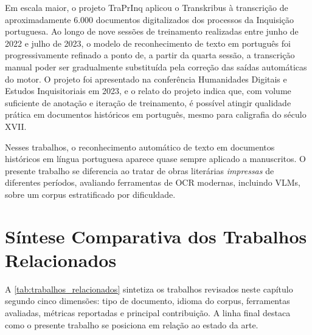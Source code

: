 \documentclass[noabntexcite,oneside]{ufsc-thesis-rn46-2019}
\begin{document}
Em escala maior, o projeto TraPrInq \cite{baudry2023} aplicou o Transkribus à transcrição
de aproximadamente 6.000 documentos digitalizados dos processos da Inquisição portuguesa.
Ao longo de nove sessões de treinamento realizadas entre junho de 2022 e julho de 2023,
o modelo de reconhecimento de texto em português foi progressivamente refinado a ponto
de, a partir da quarta sessão, a transcrição manual poder ser gradualmente substituída
pela correção das saídas automáticas do motor. O projeto foi apresentado na conferência
Humanidades Digitais e Estudos Inquisitoriais em 2023, e o relato do projeto indica que,
com volume suficiente de anotação e iteração de treinamento, é possível atingir qualidade
prática em documentos históricos em português, mesmo para caligrafia do século XVII.

Nesses trabalhos, o reconhecimento automático de texto em documentos históricos em
língua portuguesa aparece quase sempre aplicado a manuscritos. O presente trabalho se
diferencia ao tratar de obras literárias \textit{impressas} de diferentes períodos,
avaliando ferramentas de OCR modernas, incluindo VLMs, sobre um corpus estratificado por
dificuldade.

\section{Síntese Comparativa dos Trabalhos Relacionados}
\label{sec:sintese_relacionados}

A \autoref{tab:trabalhos_relacionados} sintetiza os trabalhos revisados neste
capítulo segundo cinco dimensões: tipo de documento, idioma do corpus, ferramentas
avaliadas, métricas reportadas e principal contribuição. A linha final destaca como
o presente trabalho se posiciona em relação ao estado da arte.
\end{document}
